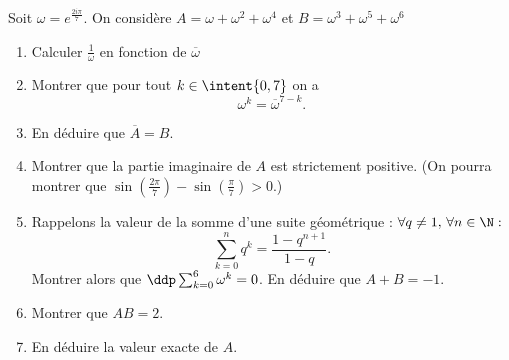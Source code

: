 \begin{exercice}
Soit $\omega =e^{\frac{2i\pi}{7}}$. On considère $A=\omega+\omega^2 +\omega^4$ et $B =\omega^3+\omega^5 +\omega^6$

\begin{enumerate}
\item Calculer $\frac{1}{\omega}$ en fonction de $\overline{\omega}$
\item Montrer que pour tout $k\in \intent{0,7}$ on a 
$$\omega^k =\overline{\omega}^{7-k}.$$
\item En déduire que $\overline{A}=B$.
\item Montrer que la partie imaginaire de $A$ est strictement positive. (On pourra montrer que $\sin\left( \frac{2\pi}{7}\right)-\sin\left( \frac{\pi}{7}\right)>0$.)
\item  Rappelons la valeur de la  somme d'une suite géométrique : $\forall q\neq 1, \, \forall n\in \N : $
$$\sum_{k=0}^n q^k =\frac{1-q^{n+1}}{1-q}.$$
Montrer alors que $\ddp \sum_{k=0}^6 \omega^k =0$. En déduire que $A+B=-1$.
\item Montrer que $AB=2$. 

\item En déduire la valeur exacte de $A$.


\end{enumerate}
\end{exercice}
